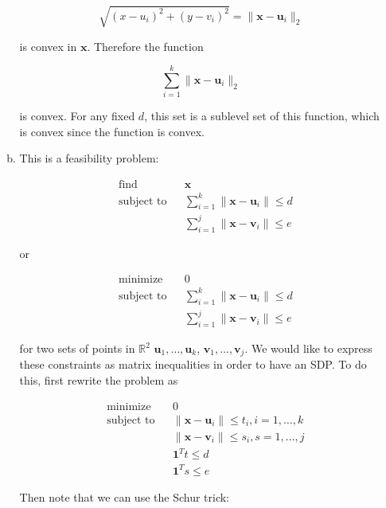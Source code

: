 \begin{enumerate}[(1)]
\begin{enumerate}[(a)]
\[
\sqrt{(x - u_i)^2 + (y- v_i)^2} = \lVert \boldsymbol{x} - \boldsymbol{u}_i \rVert_2
\]

is convex in \(\boldsymbol{x}\). Therefore the function

\[
\sum_{i=1}^k \lVert \boldsymbol{x} - \boldsymbol{u}_i \rVert_2
\]

is convex. For any fixed \(d\), this set is a sublevel set of this function, which is convex since the function is convex.


\item This is a feasibility problem:

\[
\begin{aligned}
& {\text{find}}
& & \boldsymbol{x} \\
& \text{subject to}
& & \sum_{i=1}^k \lVert \boldsymbol{x} - \boldsymbol{u}_i \rVert \leq d \\
& & & \sum_{i=1}^j \lVert \boldsymbol{x} - \boldsymbol{v}_i \rVert \leq e 
\end{aligned}
\]

or

\[
\begin{aligned}
& {\text{minimize}}
& & 0 \\
& \text{subject to}
& & \sum_{i=1}^k \lVert \boldsymbol{x} - \boldsymbol{u}_i \rVert \leq d \\
& & & \sum_{i=1}^j \lVert \boldsymbol{x} - \boldsymbol{v}_i \rVert \leq e 
\end{aligned}
\]

for two sets of points in \(\mathbb{R}^2\) \(\boldsymbol{u}_1, \ldots, \boldsymbol{u}_k\), \(\boldsymbol{v}_1, \ldots, \boldsymbol{v}_j\). We would like to express these constraints as matrix inequalities in order to have an SDP. To do this, first rewrite the problem as 

\[
\begin{aligned}
& {\text{minimize}}
& & 0 \\
& \text{subject to}
& & \lVert \boldsymbol{x} - \boldsymbol{u}_i \rVert \leq t_i, i = 1, \ldots, k \\
& & & \lVert \boldsymbol{x} - \boldsymbol{v}_i \rVert \leq s_i, s = 1, \ldots, j \\
& & & \boldsymbol{1}^T t \leq d \\
& & & \boldsymbol{1}^T s \leq e
\end{aligned}
\]

Then note that we can use the Schur trick:


\end{enumerate}
\end{enumerate}
